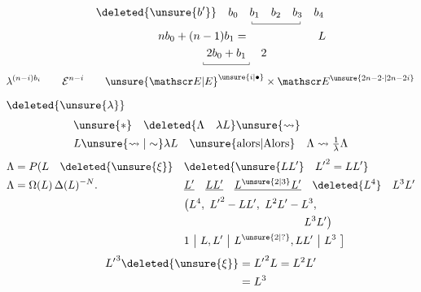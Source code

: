 \[
\begin{aligned}
\deleted{\unsure{b'}}\quad b_0\quad&
\underset{\rule{.35pt}{.55ex}\rule{4.2em}{.35pt}\rule{.35pt}{.55ex}}{b_1\quad b_2\quad b_3}\quad b_4\\
n b_0+(n-1)b_1={}&\hspace{6em} L\\
\underset{\rule{.35pt}{.55ex}\rule{4em}{.35pt}\rule{.35pt}{.55ex}}{2b_0+b_1}&\quad 2
\end{aligned}
\]
\[
\lambda^{(n-i)b_i}\qquad \mathcal E^{n-i}\qquad
\unsure{\mathscr E|E}^{\unsure{i|\bullet}}\times\mathscr E^{\unsure{2n-2\cdot|2n-2i}}
\]
$\deleted{\unsure{\lambda}}$
\[
\begin{aligned}
&\unsure{*}\quad\deleted{\Lambda\quad\lambda L}\unsure{\leadsto}\\
& L\unsure{\leadsto|\sim}\lambda L\quad\text{\unsure{alors|Alors}}\quad \Lambda\leadsto\tfrac1\lambda\Lambda
\end{aligned}
\]
\[
\begin{aligned}
\Lambda&=P(L\quad\deleted{\unsure{\xi}} &&\deleted{\unsure{LL'}\quad {L'}^{2}=LL'}\\
\Lambda&=\Omega(L)\,\Delta(L)^{-N}. &&\underline{L'}\quad\underline{LL'}\quad\underline{L^{\unsure{2|3}}L'}\quad\deleted{L^4}\quad L^3L'\\
&&&\bigl(L^4,\ {L'}^{2}-LL',\ L^2L'-L^3,\\
&&&\hspace{11em} L^3L'\bigr)\\
&&&1\ \big|\ L,L'\ \big|\ L^{\unsure{2|?}},LL'\ \big|\ L^3\ \bigr]
\end{aligned}
\]
\[
\begin{aligned} {L'}^{3}\deleted{\unsure{\xi}}&={L'}^{2}L=L^2L'\\&=L^3\end{aligned}
\]
